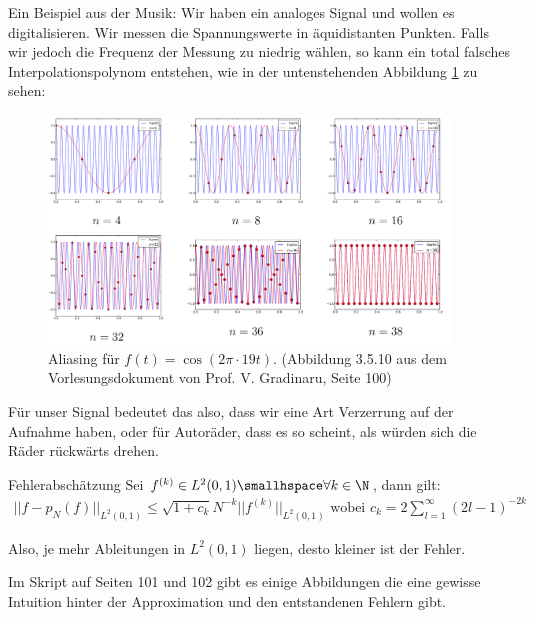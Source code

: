 \inlineex Ein Beispiel aus der Musik: Wir haben ein analoges Signal und wollen es digitalisieren. 
Wir messen die Spannungswerte in äquidistanten Punkten. 
Falls wir jedoch die Frequenz der Messung zu niedrig wählen, so kann ein total falsches Interpolationspolynom entstehen,
wie in der untenstehenden Abbildung \ref{fig:aliasing} zu sehen:
\begin{figure}[h!]
    \begin{center}
        \includegraphics[width=0.95\textwidth]{assets/01_interpolation/01_trigonometric/aliasing-in-music.png}
    \end{center}
    \caption{Aliasing für $f(t) = \cos(2\pi \cdot 19t)$. (Abbildung 3.5.10 aus dem Vorlesungsdokument von Prof. V. Gradinaru, Seite 100)}
    \label{fig:aliasing}
\end{figure}
Für unser Signal bedeutet das also, dass wir eine Art Verzerrung auf der Aufnahme haben, oder für Autoräder, dass es so scheint, als würden sich die Räder rückwärts drehen.

\begin{theorem}[]{Fehlerabschätzung}
    Sei $f^{(k)} \in L^2(0, 1) \smallhspace \forall k \in \N$, dann gilt:
    \rmvspace
    \begin{align*}
        ||f - p_N(f)||_{L^2(0, 1)} \leq \sqrt{1 + c_k} N^{-k} ||f^{(k)}||_{L^2(0, 1)} \text{ wobei } c_k = 2 \sum_{l = 1}^{\infty} (2l - 1)^{-2k}
    \end{align*}
\end{theorem}
Also, je mehr Ableitungen in $L^2(0, 1)$ liegen, desto kleiner ist der Fehler.


Im Skript auf Seiten 101 und 102 gibt es einige Abbildungen die eine gewisse Intuition hinter der Approximation und den entstandenen Fehlern gibt.

